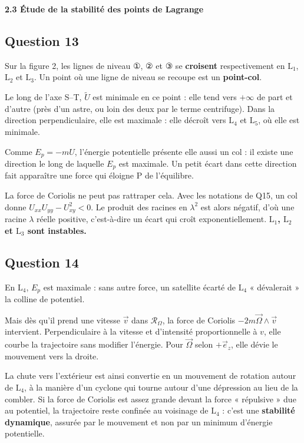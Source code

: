 \documentclass[11pt,a4paper]{article}
\begin{document}
\textbf{2.3 Étude de la stabilité des points de Lagrange}

\hypertarget{question-13}{%
\subsection{Question 13}\label{question-13}}

Sur la figure 2, les lignes de niveau ①, ② et ③ se \textbf{croisent} respectivement en \(\mathrm L_1\), \(\mathrm L_2\) et \(\mathrm L_3\). Un point où une ligne de niveau se recoupe est un \textbf{point-col}.

Le long de l'axe S--T, \(\tilde U\) est minimale en ce point : elle tend vers \(+\infty\) de part et d'autre (près d'un astre, ou loin des deux par le terme centrifuge). Dans la direction perpendiculaire, elle est maximale : elle décroît vers \(\mathrm L_4\) et \(\mathrm L_5\), où elle est minimale.

Comme \(E_p=-mU\), l'énergie potentielle présente elle aussi un col : il existe une direction le long de laquelle \(E_p\) est maximale. Un petit écart dans cette direction fait apparaître une force qui éloigne P de l'équilibre.

La force de Coriolis ne peut pas rattraper cela. Avec les notations de Q15, un col donne \(U_{xx}U_{yy}-U_{xy}^2<0\). Le produit des racines en \(\lambda^2\) est alors négatif, d'où une racine \(\lambda\) réelle positive, c'est-à-dire un écart qui croît exponentiellement. \textbf{\(\mathrm L_1\), \(\mathrm L_2\) et \(\mathrm L_3\) sont instables.}

\hypertarget{question-14}{%
\subsection{Question 14}\label{question-14}}

En \(\mathrm L_4\), \(E_p\) est maximale : sans autre force, un satellite écarté de \(\mathrm L_4\) « dévalerait » la colline de potentiel.

Mais dès qu'il prend une vitesse \(\vec v\) dans \(\mathcal R_\Omega\), la force de Coriolis \(-2m\vec\Omega\wedge\vec v\) intervient. Perpendiculaire à la vitesse et d'intensité proportionnelle à \(v\), elle courbe la trajectoire sans modifier l'énergie. Pour \(\vec\Omega\) selon \(+\vec e_z\), elle dévie le mouvement vers la droite.

La chute vers l'extérieur est ainsi convertie en un mouvement de rotation autour de \(\mathrm L_4\), à la manière d'un cyclone qui tourne autour d'une dépression au lieu de la combler. Si la force de Coriolis est assez grande devant la force « répulsive » due au potentiel, la trajectoire reste confinée au voisinage de \(\mathrm L_4\) : c'est une \textbf{stabilité dynamique}, assurée par le mouvement et non par un minimum d'énergie potentielle.
\end{document}
